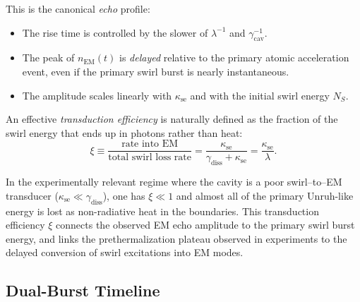         This is the canonical \emph{echo} profile:

        \begin{itemize}
            \item The rise time is controlled by the slower of
            $\lambda^{-1}$ and $\gamma_{\mathrm{cav}}^{-1}$.
            \item The peak of $n_{\mathrm{EM}}(t)$ is \emph{delayed} relative to the
            primary atomic acceleration event, even if the primary
            swirl burst is nearly instantaneous.
            \item The amplitude scales linearly with $\kappa_{\text{se}}$ and with the
            initial swirl energy $N_S$.
        \end{itemize}

        An effective \emph{transduction efficiency} is naturally defined as the
        fraction of the swirl energy that ends up in photons rather than heat:
        \begin{equation}
            \xi
            \equiv
            \frac{\text{rate into EM}}{\text{total swirl loss rate}}
            =
            \frac{\kappa_{\text{se}}}{\gamma_{\mathrm{diss}} + \kappa_{\text{se}}}
            =
            \frac{\kappa_{\text{se}}}{\lambda}.
            \label{eq:xi_definition}
        \end{equation}

        In the experimentally relevant regime where the cavity is a poor
        swirl--to--EM transducer ($\kappa_{\text{se}} \ll \gamma_{\mathrm{diss}}$), one has
        $\xi \ll 1$ and almost all of the primary Unruh-like energy is lost as
        non-radiative heat in the boundaries. This transduction efficiency $\xi$
        connects the observed EM echo amplitude to the primary swirl burst energy,
        and links the prethermalization plateau observed in experiments
        \cite{Saha2025} to the delayed conversion of swirl excitations into EM modes.


\subsection{Dual-Burst Timeline}

